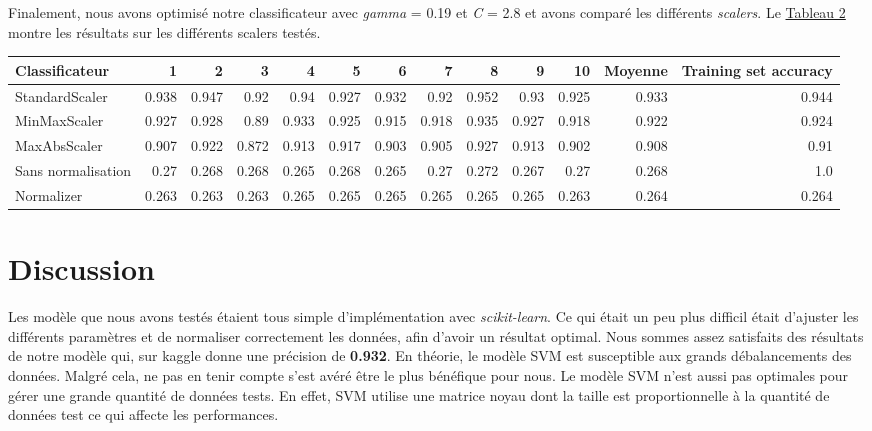 \documentclass[12pt]{extarticle}
\begin{document}
Finalement, nous avons optimisé notre classificateur avec \emph{gamma} = 0.19 et \emph{C} = 2.8 et avons comparé les différents \emph{scalers}. Le \hyperref[scalers]{Tableau 2} montre les résultats sur les différents scalers testés.
\vspace{2mm}
\vspace*{-5mm}
\label{scalers}
{\scriptsize
\begin{center}
\begin{tabular}{|l|r|r|r|r|r|r|r|r|r|r|r|r|}
\hline
Classificateur & 1 & 2 & 3 & 4 & 5 & 6 & 7 & 8 & 9 & 10 & \textbf{Moyenne} & \textbf{Training set accuracy}\\
\hline
StandardScaler & 0.938 & 0.947 & 0.92 & 0.94 & 0.927 & 0.932 & 0.92 & 0.952 & 0.93 & 0.925 & 0.933 & 0.944\\
\hline
MinMaxScaler & 0.927 & 0.928 & 0.89 & 0.933 & 0.925 & 0.915 & 0.918 & 0.935 & 0.927 & 0.918 & 0.922 & 0.924\\
\hline
MaxAbsScaler & 0.907 & 0.922 & 0.872 & 0.913 & 0.917 & 0.903 & 0.905 & 0.927 & 0.913 & 0.902 & 0.908 & 0.91\\
\hline
Sans normalisation & 0.27 & 0.268 & 0.268 & 0.265 & 0.268 & 0.265 & 0.27 & 0.272 & 0.267 & 0.27 & 0.268 & 1.0\\
\hline
Normalizer & 0.263 & 0.263 & 0.263 & 0.265 & 0.265 & 0.265 & 0.265 & 0.265 & 0.265 & 0.263 & 0.264 & 0.264\\
\hline
\end{tabular}
\end{center}
}

\section{Discussion}
\label{sec:orgc543904}
\setlength\parindent{20pt}Les modèle que nous avons testés étaient tous simple d'implémentation avec \emph{scikit-learn}. Ce qui était un peu plus difficil était d'ajuster les différents paramètres et de normaliser correctement les données, afin d'avoir un résultat optimal. Nous sommes assez satisfaits des résultats de notre modèle qui, sur kaggle donne une précision de \textbf{0.932}. En théorie, le modèle SVM est susceptible aux grands débalancements des données. Malgré cela, ne pas en tenir compte s'est avéré être le plus bénéfique pour nous. Le modèle SVM n'est aussi pas optimales pour gérer une grande quantité de données tests. En effet, SVM utilise une matrice noyau dont la taille est proportionnelle à la quantité de données test ce qui affecte les performances.
\end{document}
